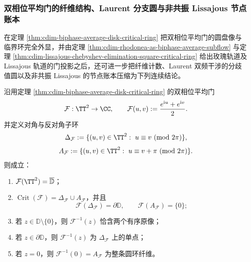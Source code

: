 \subsubsection{双相位平均门的纤维结构、Laurent 分支圆与非共振 Lissajous 节点账本}\label{subsubsec:cdim-biphase-fiber-laurent-lissajous-node-ledger}
在定理 \ref{thm:cdim-biphase-average-disk-critical-ring} 把双相位平均门的圆盘像与临界环完全外显，并由定理 \ref{thm:cdim-rhodonea-as-biphase-average-subflow} 与定理 \ref{thm:cdim-lissajous-chebyshev-elimination-square-critical-ring} 给出玫瑰轨道及 Lissajous 轨道的门投影之后，还可进一步把纤维计数、Laurent 双频干涉的分歧值圆以及非共振 Lissajous 的节点账本压缩为下列连续结论。

\begin{theorem}[双相位平均门的有序纤维计数与反对角退化]\label{thm:cdim-biphase-average-fiber-diagonal-antidiagonal}
沿用定理 \ref{thm:cdim-biphase-average-disk-critical-ring} 的双相位平均门
\[
\mathcal F:\TT^2\to\CC,
\qquad
\mathcal F(u,v):=\frac{e^{\mathrm{i}u}+e^{\mathrm{i}v}}{2}.
\]
并定义对角与反对角子环
\[
\Delta_{\mathcal F}:=
\{(u,v)\in\TT^2:\ u\equiv v\ (\mathrm{mod}\ 2\pi)\},
\]
\[
A_{\mathcal F}:=
\{(u,v)\in\TT^2:\ u\equiv v+\pi\ (\mathrm{mod}\ 2\pi)\}.
\]
则成立：
\begin{enumerate}
  \item \(\mathcal F(\TT^2)=\overline{\mathbb D}\)；
  \item \(\operatorname{Crit}(\mathcal F)=\Delta_{\mathcal F}\cup A_{\mathcal F}\)，并且
  \[
  \mathcal F(\Delta_{\mathcal F})=\partial\mathbb D,
  \qquad
  \mathcal F(A_{\mathcal F})=\{0\};
  \]
  \item 若 \(z\in\mathbb D\setminus\{0\}\)，则 \(\mathcal F^{-1}(z)\) 恰含两个有序原像；
  \item 若 \(z\in\partial\mathbb D\)，则 \(\mathcal F^{-1}(z)\) 为 \(\Delta_{\mathcal F}\) 上的单点；
  \item 若 \(z=0\)，则 \(\mathcal F^{-1}(0)=A_{\mathcal F}\) 为整条圆环纤维。
\end{enumerate}
\end{theorem}
